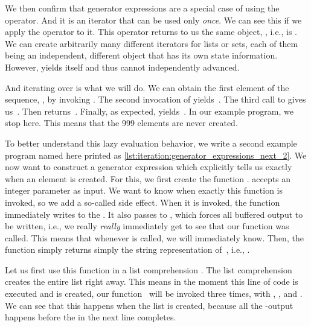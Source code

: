 We then confirm that generator expressions are a special case of  using the  operator.
And it is an iterator that can be used only \emph{once}.
We can see this if we apply the  operator to it.
This operator returns to us the same object, , i.e.,  is .
We can create arbitrarily many different iterators for lists or sets, each of them being an independent, different object that has its own state information.
However,  yields  itself and thus cannot independently advanced.

And iterating over  is what we will do.
We can obtain the first element of the sequence, , by invoking .
The second invocation of  yields~.
The third call to  gives us~.
Then  returns~.
Finally, as expected,  yields~.
In our example program, we stop here.
This means that the 999 elements are never created.

To better understand this lazy evaluation behavior, we write a second example program named  here printed as \cref{lst:iteration:generator_expressions_next_2}.
We now want to construct a generator expression which explicitly tells us exactly when an element is created.
For this, we first create the function .
 accepts an integer parameter  as input.
We want to know when exactly this function is invoked, so we add a so-called side effect.
When it is invoked, the function immediately writes  to the .
It also passes  to , which forces all buffered output to be written, i.e., we really \emph{really} immediately get to see that our function was called.
This means that whenever  is called, we will immediately know.
Then, the function simply returns simply the string representation of~, i.e., .

Let us first use this function in a list comprehension .
The list comprehension creates the entire list right away.
This means in the moment this line of code is executed and  is created, our function~ will be invoked three times, with , , and .
We can see that this happens when the list is created, because all the -output happens before the  in the next line completes.

